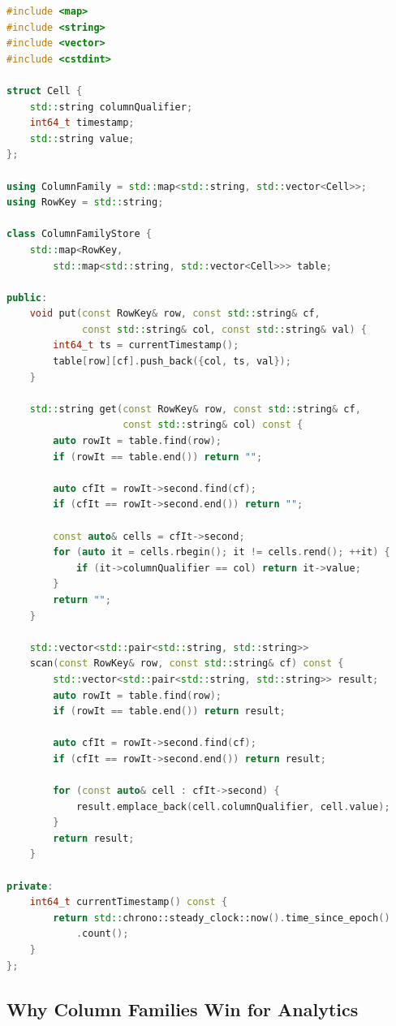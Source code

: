 \begin{lstlisting}[language=C++]
#include <map>
#include <string>
#include <vector>
#include <cstdint>

struct Cell {
    std::string columnQualifier;
    int64_t timestamp;
    std::string value;
};

using ColumnFamily = std::map<std::string, std::vector<Cell>>;
using RowKey = std::string;

class ColumnFamilyStore {
    std::map<RowKey,
        std::map<std::string, std::vector<Cell>>> table;

public:
    void put(const RowKey& row, const std::string& cf,
             const std::string& col, const std::string& val) {
        int64_t ts = currentTimestamp();
        table[row][cf].push_back({col, ts, val});
    }

    std::string get(const RowKey& row, const std::string& cf,
                    const std::string& col) const {
        auto rowIt = table.find(row);
        if (rowIt == table.end()) return "";

        auto cfIt = rowIt->second.find(cf);
        if (cfIt == rowIt->second.end()) return "";

        const auto& cells = cfIt->second;
        for (auto it = cells.rbegin(); it != cells.rend(); ++it) {
            if (it->columnQualifier == col) return it->value;
        }
        return "";
    }

    std::vector<std::pair<std::string, std::string>>
    scan(const RowKey& row, const std::string& cf) const {
        std::vector<std::pair<std::string, std::string>> result;
        auto rowIt = table.find(row);
        if (rowIt == table.end()) return result;

        auto cfIt = rowIt->second.find(cf);
        if (cfIt == rowIt->second.end()) return result;

        for (const auto& cell : cfIt->second) {
            result.emplace_back(cell.columnQualifier, cell.value);
        }
        return result;
    }

private:
    int64_t currentTimestamp() const {
        return std::chrono::steady_clock::now().time_since_epoch()
            .count();
    }
};
\end{lstlisting}

\subsection{Why Column Families Win for Analytics}

